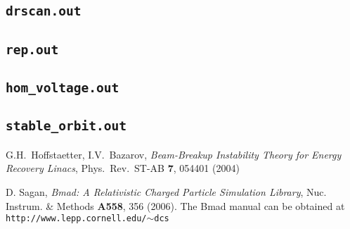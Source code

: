 \documentclass[11pt]{article}
\begin{document}
\subsection{\tt{drscan.out}}
\subsection{\tt{rep.out}}
\subsection{\tt{hom_voltage.out}}
\subsection{\tt{stable_orbit.out}}

\begin{thebibliography}{9}


 G.H.~Hoffstaetter, I.V.~Bazarov, \emph{
Beam-Breakup Instability Theory for Energy Recovery Linacs},
Phys.~Rev.~ST-AB {\bf 7}, 054401 (2004)

D. Sagan, {\em Bmad: A Relativistic Charged Particle Simulation Library},
Nuc. Instrum. \& Methods {\bf A558}, 356 (2006).
The Bmad manual can be obtained at {\tt http://www.lepp.cornell.edu/{$\sim$}dcs}

\end{thebibliography}
\end{document}
